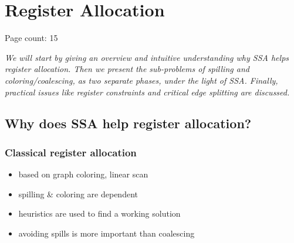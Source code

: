 \chapter{Register Allocation}

Page count: 15



{\it
We will start by giving an overview and intuitive understanding why SSA helps 
register allocation. Then we present the sub-problems of spilling and 
coloring/coalescing, as two separate phases, under the light of SSA. Finally, 
practical issues like register constraints and critical edge splitting are 
discussed.


}


\section{Why does SSA help register allocation?}


\subsection{Classical register allocation}

\begin{itemize}
  \item based on graph coloring, linear scan
  \item spilling \& coloring are dependent
  \item heuristics are used to find a working solution
  \item avoiding spills is more important than coalescing
\end{itemize}


